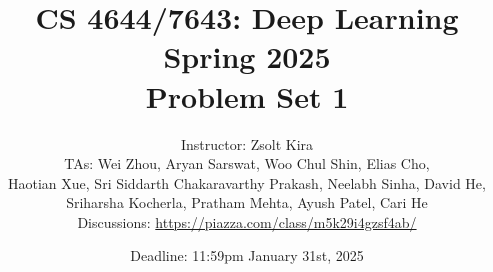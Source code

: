 \documentclass[11pt,english]{article}
\begin{document}
\title{CS 4644/7643: Deep Learning\\
Spring 2025 \\
Problem Set 1}

\author{Instructor: Zsolt Kira \\
TAs: Wei Zhou, Aryan Sarswat, Woo Chul Shin, Elias Cho, \\Haotian Xue, Sri Siddarth Chakaravarthy Prakash, Neelabh Sinha, David He, \\ Sriharsha Kocherla, Pratham Mehta, Ayush Patel, Cari He\\
Discussions: \url{https://piazza.com/class/m5k29i4gzsf4ab/}}
\date{Deadline: 11:59pm January 31st, 2025}
\maketitle
\end{document}
